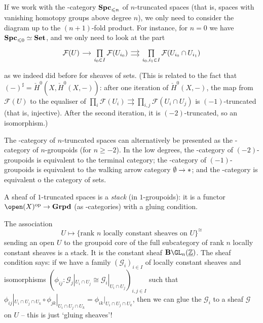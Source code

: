 If we work with the \oo-category \(\mathbf{Spc}_{\leqslant n}\) of \(n\)-truncated spaces (that is, spaces with vanishing homotopy groups above degree \(n\)), we only need to consider the diagram up to the \((n+1)\)-fold product.
For instance, for \(n=0\) we have \(\mathbf{Spc}_{\leqslant 0}\simeq\mathbf{Set}\), and we only need to look at the part
\begin{equation*}
  \begin{tikzcd}[column sep=small]
    \mathcal F(U) \ar{r} & \prod\limits_{i_0\in I}\mathcal F(U_{i_0}) \ar[shift left]{r} \ar[shift right]{r} & \prod\limits_{i_0,i_1\in I}\mathcal F(U_{i_0}\cap U_{i_1})
  \end{tikzcd}
\end{equation*}
as we indeed did before for sheaves of sets.
(This is related to the fact that \((-)^\sharp=\check{H}^0(X,\check{H}^0(X,-))\): after one iteration of \(\check{H}^0(X,-)\), the map from \(\mathcal F(U)\) to the equaliser of \(\prod_i\mathcal F(U_i)\rightrightarrows \prod_{i,j}\mathcal F(U_i\cap U_j)\) is \((-1)\)-truncated (that is, injective).
After the second iteration, it is \((-2)\)-truncated, so an isomorphism.)

The \oo-category of \(n\)-truncated spaces can alternatively be presented as the \oo-category of \(n\)-groupoids (for \(n\geq -2\)).
In the low degrees, the \oo-category of \((-2)\)-groupoids is equivalent to the terminal category; the \oo-category of \((-1)\)-groupoids is equivalent to the walking arrow category \(\emptyset\to{\mathord{*}}\); and the \oo-category is equivalent o the category of sets.

\begin{exmp}
A sheaf of \(1\)-truncated spaces is a \emph{stack} (in \(1\)-groupoids): it is a functor \(\open(X)\opp\to\catGroupoid\) (as \oo-categories) with a gluing condition.
\end{exmp}

\begin{exmp}
The association
\[ U \mapsto \{\text{rank } n \text{ locally constant sheaves on } U\}^\cong \]
sending an open \(U\) to the groupoid core of the full subcategory of rank \(n\) locally constant sheaves is a stack.
It is the constant sheaf \(\deloop\GL_n(\underline{\bb Z})\).
The sheaf condition says: if we have a family \((\mathcal G_i)_{i\in I}\) of locally constant sheaves and isomorphisms \((\phi_{ij}\colon\mathcal G_j|_{U_i\cap U_j}\cong\mathcal G_i|_{U_i\cap U_j})_{i,j\in I}\) such that \(\phi_{ij}|_{U_i\cap U_j\cap U_k}\circ\phi_{jk}|_{U_i\cap U_j\cap U_k}=\phi_{ik}|_{U_i\cap U_j\cap U_k}\), then we can glue the \(\mathcal G_i\) to a sheaf \(\mathcal G\) on \(U\) -- this is just `gluing sheaves'!
\end{exmp}

